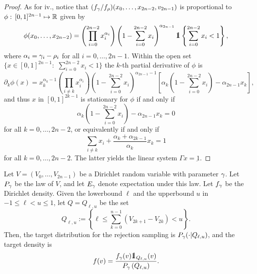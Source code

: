 \documentclass[10pt, article,table]{article}
\begin{document}
\begin{proof}
As for iv., notice that $(\dirichletDensity[\dirparam]/\dirichletDensity[\rho]) (x_0,\dots,x_{2n-2},v_{2n-1})$ is proportional to $\phi:\,  [0,1]^{2n-1} \mapsto \R$ given by 
\begin{equation*}
 \phi(x_0,\dots,x_{2n-2}) = 
 \left( \prod_{i=0}^{2n-2} x_{i}^{\alpha_i}\right)
 \left( 1-\sum_{i=0}^{2n-2} x_i \right)^{\alpha_{2n-1}}
 \one\left\lbrace \sum_{i=0}^{2n-2} x_i < 1 \right\rbrace,
\end{equation*}
where $\alpha_i = \dirparam_i  - \rho_i$ for all $i=0,\dots,2n-1$. Within the open set $\lbrace x \in [0,1]^{2n-1}: \, \, \sum_{i=0}^{2n-2} x_i < 1 \rbrace$ the $k$-th partial derivative of $\phi$ is 
\begin{equation*}
 \partial_k \phi(x) = 
 x_{k}^{\alpha_k -1 } 
 \left( \prod_{i\neq k } x_{i}^{\alpha_i}\right)
 \left( 1-\sum_{i=0}^{2n-2} x_i \right)^{\alpha_{2n-1}-1}
 \left[
 \alpha_k \left( 1-\sum_{i=0}^{2n-2} x_i \right) - \alpha_{2n-1} x_k
 \right],
\end{equation*}
and thus $x$ in $[0,1]^{2k-1}$ is stationary for $\phi$ if and only if 
\begin{equation*}
 \alpha_k \left( 1-\sum_{i=0}^{2n-2} x_i \right) - \alpha_{2n-1} x_k = 0
\end{equation*}
for all $k=0,\dots,2n-2$, or equivalently if and only if  
\begin{equation*}
 \sum_{i\neq k} x_i + \frac{\alpha_k + \alpha_{2k-1}}{\alpha_k}x_k = 1
\end{equation*}
for all $k=0,\dots,2n-2$. The latter yields the linear system $\Gamma x = \underbar{1}$. 
\end{proof}



Let $V=(V_{0}, \dots,V_{2n-1})$ be a Dirichlet random variable with parameter $\dirparam$. Let $\dirichletLaw$ be the law of $V$, and let $\Expectation_{\dirparam}$ denote expectation under this law. Let $\dirichletDensity$ be the Dirichlet density.  Given the lowerbound $\ell$ and the upperbound $u$ in $-1\leq \ell < u \leq 1$, let $Q=Q_{\ell, u}$ be the set 
\begin{equation}\label{eq.volimb_constraint}
 Q_{\ell,u}:= \left\lbrace
 \ell \leq \sum_{k=0}^{n-1} \left( V_{2k+1} - V_{2k} \right)
 < u
 \right\rbrace. 
\end{equation}
Then, the target distribution for the rejection sampling is $\dirichletLaw(\cdot \vert Q_{\ell,u})$, and the target density is 
\begin{equation}\label{eq.target_density}
 \targetDensity(v) = 
 \frac{\dirichletDensity(v)\one _{Q_{\ell,u}} (v)}{\dirichletLaw\left(Q_{\ell,u}\right)}. 
\end{equation}
\end{document}
